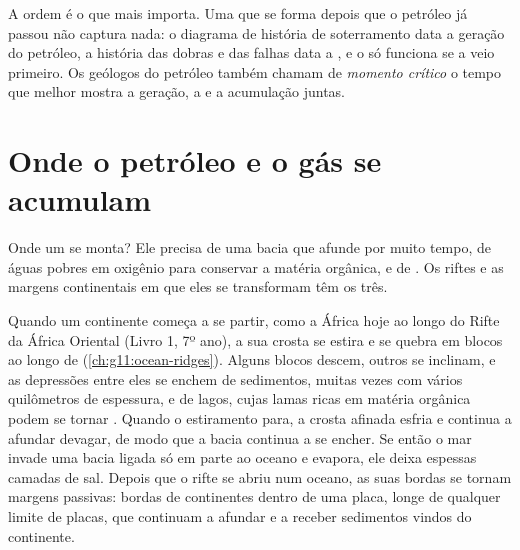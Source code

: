 A ordem é o que mais importa. Uma  que se forma depois que o
petróleo já passou não captura nada: o diagrama de história de soterramento
data a geração do petróleo, a história das dobras e das falhas data a
, e o  só funciona se a  veio primeiro.
Os geólogos do petróleo também chamam de \emph{momento crítico} o tempo que
melhor mostra a geração, a  e a acumulação juntas.

\section{Onde o petróleo e o gás se acumulam}

Onde um  se monta? Ele precisa de uma bacia que afunde
por muito tempo, de águas pobres em oxigênio para conservar a matéria
orgânica, e de . Os riftes e as margens continentais em que
eles se transformam têm os três.

Quando um continente começa a se partir, como a África hoje ao longo do
Rifte da África Oriental (Livro 1, 7º ano), a sua crosta se estira e se
quebra em blocos ao longo de  (\cref{ch:g11:ocean-ridges}).
Alguns blocos descem, outros se inclinam, e as depressões entre eles se
enchem de sedimentos, muitas vezes com vários quilômetros de espessura, e de
lagos, cujas lamas ricas em matéria orgânica podem se tornar . Quando
o estiramento para, a crosta afinada esfria e continua a afundar devagar, de
modo que a bacia continua a se encher. Se então o mar invade uma bacia
ligada só em parte ao oceano e evapora, ele deixa espessas camadas de sal.
Depois que o rifte se abriu num oceano, as suas bordas se tornam margens
passivas: bordas de continentes dentro de uma placa, longe de qualquer
limite de placas, que continuam a afundar e a receber sedimentos vindos do
continente.

